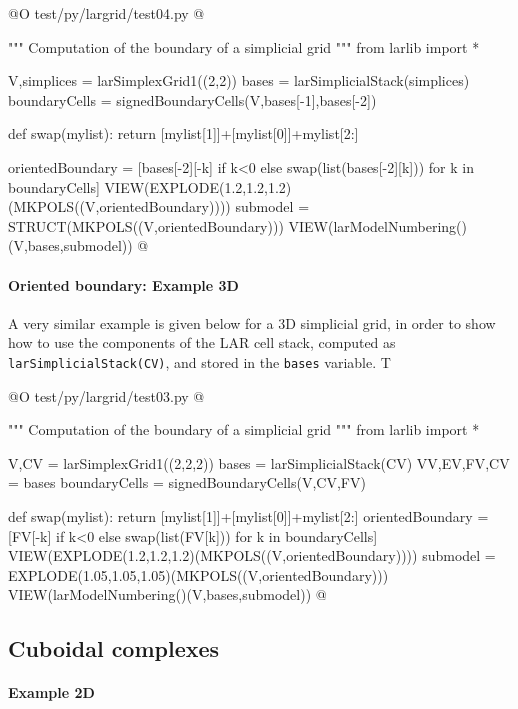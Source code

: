 \documentclass[11pt,oneside]{article}	%
\begin{document}
@O test/py/largrid/test04.py
@{""" Computation of the boundary of a simplicial grid """
from larlib import *

V,simplices = larSimplexGrid1((2,2))
bases = larSimplicialStack(simplices)
boundaryCells = signedBoundaryCells(V,bases[-1],bases[-2])

def swap(mylist): 
    return [mylist[1]]+[mylist[0]]+mylist[2:]
    
orientedBoundary = [bases[-2][-k] if k<0 else swap(list(bases[-2][k]))
						for k in boundaryCells]
VIEW(EXPLODE(1.2,1.2,1.2)(MKPOLS((V,orientedBoundary))))
submodel = STRUCT(MKPOLS((V,orientedBoundary)))
VIEW(larModelNumbering()(V,bases,submodel))
@}


\paragraph{Oriented boundary: Example 3D}
A very similar example is given below for a 3D simplicial grid, in order to show 
how to use the components of the LAR cell stack, computed as \texttt{larSimplicialStack(CV)}, and stored in the \texttt{bases} variable. T

@O test/py/largrid/test03.py
@{""" Computation of the boundary of a simplicial grid """
from larlib import *

V,CV = larSimplexGrid1((2,2,2))
bases = larSimplicialStack(CV)
VV,EV,FV,CV = bases
boundaryCells = signedBoundaryCells(V,CV,FV)

def swap(mylist): return [mylist[1]]+[mylist[0]]+mylist[2:]
orientedBoundary = [FV[-k] if k<0 else swap(list(FV[k])) for k in boundaryCells]
VIEW(EXPLODE(1.2,1.2,1.2)(MKPOLS((V,orientedBoundary))))
submodel = EXPLODE(1.05,1.05,1.05)(MKPOLS((V,orientedBoundary)))
VIEW(larModelNumbering()(V,bases,submodel))
@}

\subsection{Cuboidal complexes}


\paragraph{Example 2D}
\end{document}
